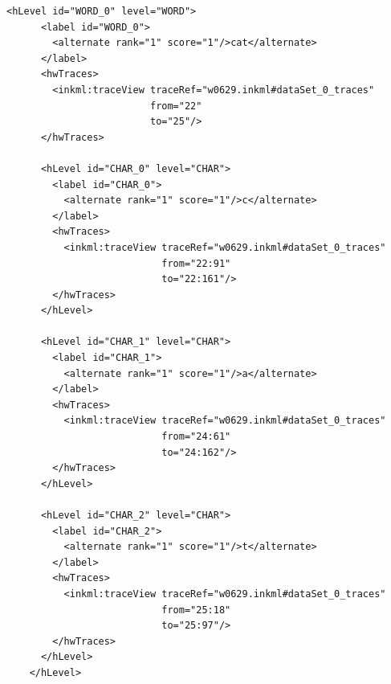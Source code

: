 \begin{xmlcode}
  \begin{lstlisting}[emph={hLevel,hwTraces},
                     emphstyle={\color{blue}\textbf},
                     emph={[2]id,level},
                     emphstyle={[2]\color{red}},
                     caption={Demonstration of the \emph{hLevel} tag in UPX},
                     label=lst:hLevelinupx]
    <hLevel id="WORD_0" level="WORD">
      <label id="WORD_0">
        <alternate rank="1" score="1"/>cat</alternate>
      </label>
      <hwTraces> 
        <inkml:traceView traceRef="w0629.inkml#dataSet_0_traces" 
                         from="22" 
                         to="25"/>
      </hwTraces>

      <hLevel id="CHAR_0" level="CHAR">
        <label id="CHAR_0">
          <alternate rank="1" score="1"/>c</alternate>
        </label>
        <hwTraces> 
          <inkml:traceView traceRef="w0629.inkml#dataSet_0_traces" 
                           from="22:91" 
                           to="22:161"/>
        </hwTraces>
      </hLevel>

      <hLevel id="CHAR_1" level="CHAR">
        <label id="CHAR_1">
          <alternate rank="1" score="1"/>a</alternate>
        </label>
        <hwTraces> 
          <inkml:traceView traceRef="w0629.inkml#dataSet_0_traces" 
                           from="24:61" 
                           to="24:162"/>
        </hwTraces>
      </hLevel>

      <hLevel id="CHAR_2" level="CHAR">
        <label id="CHAR_2">
          <alternate rank="1" score="1"/>t</alternate>
        </label>
        <hwTraces> 
          <inkml:traceView traceRef="w0629.inkml#dataSet_0_traces" 
                           from="25:18" 
                           to="25:97"/>
        </hwTraces>
      </hLevel>
    </hLevel>
  \end{lstlisting}
\end{xmlcode}

